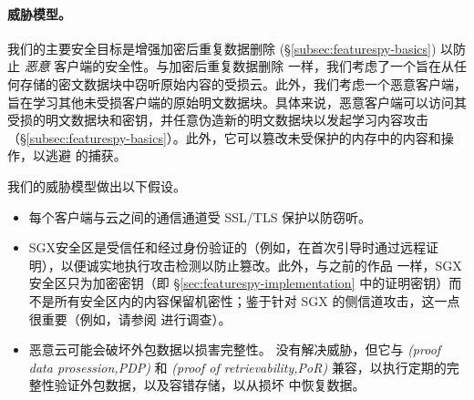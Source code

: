 \paragraph*{威胁模型。} 我们的主要安全目标是增强加密后重复数据删除 (\S\ref{subsec:featurespy-basics}) 以防止 {\em 恶意} 客户端的安全性。与加密后重复数据删除 \cite{bellare2013MLE} 一样，我们考虑了一个旨在从任何存储的密文数据块中窃听原始内容的受损云。此外，我们考虑一个恶意客户端，旨在学习其他未受损客户端的原始明文数据块。具体来说，恶意客户端可以访问其受损的明文数据块和密钥，并任意伪造新的明文数据块以发起学习内容攻击（\S\ref{subsec:featurespy-basics}）。此外，它可以篡改未受保护的内存中的内容和操作，以逃避 \sysnameF 的捕获。

我们的威胁模型做出以下假设。
\begin{itemize}[leftmargin=*]
    \item
          每个客户端与云之间的通信通道受 SSL/TLS 保护以防窃听。
    \item
          SGX安全区是受信任和经过身份验证的（例如，在首次引导时通过远程证明），以便诚实地执行攻击检测以防止篡改。此外，与之前的作品 \cite{shinde20, ren21} 一样，SGX安全区只为加密密钥（即 \S\ref{sec:featurespy-implementation} 中的证明密钥）而不是所有安全区内的内容保留机密性；鉴于针对 SGX 的侧信道攻击，这一点很重要（例如，请参阅 \cite{fei21} 进行调查）。
    \item
          恶意云可能会破坏外包数据以损害完整性。 \sysnameF 没有解决威胁，但它与 \textit{  (proof data prosession,PDP)} \cite{ateniese2007provable} 和 \textit{  (proof of retrievability,PoR)} \cite{juels07} 兼容，以执行定期的完整性验证外包数据，以及容错存储，以从损坏 \cite{li15} 中恢复数据。
\end{itemize}